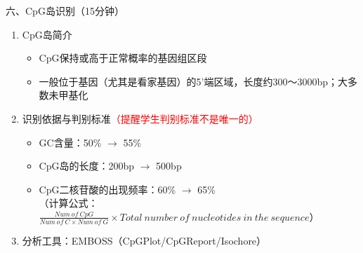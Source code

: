 \documentclass{TIJMUjiaoanLL}
\begin{document}
\otherTail
\newpage
\otherHeader


\noindent
六、CpG岛识别（15分钟）
\begin{enumerate}
  \item CpG岛简介
    \begin{itemize}
      \item CpG保持或高于正常概率的基因组区段
      \item 一般位于基因（尤其是看家基因）的5'端区域，长度约300～3000bp；大多数未甲基化
    \end{itemize}
  \item 识别依据与判别标准\textcolor{red}{（提醒学生判别标准不是唯一的）}
    \begin{itemize}
      \item GC含量：50\% $\rightarrow$ 55\%
      \item CpG岛的长度：200bp $\rightarrow$ 500bp
      \item CpG二核苷酸的出现频率：60\% $\rightarrow$ 65\%\\
	（计算公式：$\frac{Num\ of\ CpG}{Num\ of\ C \times Num\ of\ G} \times Total\ number\ of\ nucleotides\ in\ the\ sequence$）
    \end{itemize}
  \item 分析工具：EMBOSS（CpGPlot/CpGReport/Isochore）
\end{enumerate}
\end{document}
